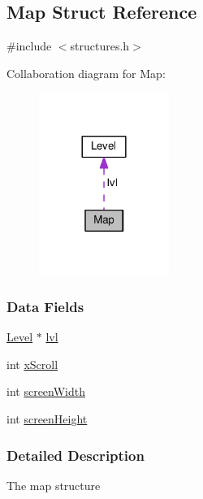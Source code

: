 \hypertarget{struct_map}{\subsection{Map Struct Reference}
\label{struct_map}
}


{\ttfamily \#include $<$structures.\-h$>$}



Collaboration diagram for Map\-:
\nopagebreak
\begin{figure}[H]
\begin{center}
\leavevmode
\includegraphics[width=120pt]{struct_map__coll__graph}
\end{center}
\end{figure}
\subsubsection*{Data Fields}
\begin{DoxyCompactItemize}
\item 
\hyperlink{struct_level}{Level} $\ast$ \hyperlink{struct_map_abca19b7de8e60347a507d1aeff95c764}{lvl}
\item 
int \hyperlink{struct_map_aa83bbdf2603e42824cd0bab44bf315c2}{x\-Scroll}
\item 
int \hyperlink{struct_map_ae50cb92a78d9e0a4f4bd718fc02bd294}{screen\-Width}
\item 
int \hyperlink{struct_map_a9ebc1dbd77788c4bfa27758a6725413f}{screen\-Height}
\end{DoxyCompactItemize}


\subsubsection{Detailed Description}
The map structure 

